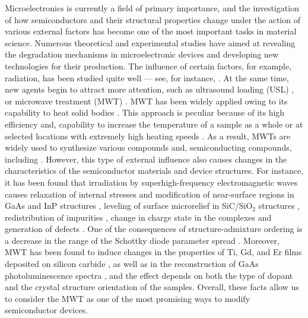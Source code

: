 \documentclass[10pt]{iopart}
\begin{document}
Microelectronics is currently a field of primary importance, and the investigation of how semiconductors and their structural properties change under the action of various external factors has become one of the most important tasks in material science.
Numerous theoretical and experimental studies have aimed at revealing the degradation mechanisms in microelectronic devices and developing new technologies for their production.
The influence of certain factors, for example, radiation, has been studied quite well --- see, for instance, \cite{KozlovsEn,RadiationEffectsBook,DefByIon}.
At the same time, new agents begin to attract more attention, such as ultrasound loading (USL) \cite{Olikh2018JAP,Olikh2006TPL},
or microwave treatment (MWT) \cite{MW:Rev,ZOHM2000,BHUNIA1998,Bacherikov2003En,Pashkov1994En,
BoltovetsEn,Milenin1994En,BelyaevIntac,ASHKINADZE1996,ProcSPIE,Belyaev1998JTFEn,
Bacherikov2008En,Konakova2015En,Konakova2012FTPEn}.
MWT has been widely applied owing to its capability to heat solid bodies \cite{MW:Rev,ZOHM2000}.
This approach is peculiar because of its high efficiency and, capability to increase the temperature
of a sample as a whole or at selected locations with extremely high heating speeds \cite{MW:Rev}.
As a result, MWTs are widely used to synthesize various compounds and, semiconducting compounds, including \cite{MW:Rev,BHUNIA1998}.
However, this type of external influence also causes changes in the  characteristics of the semiconductor materials and device structures.
For instance, it has been found that irradiation by superhigh-frequency electromagnetic waves causes relaxation of internal stresses and modification of near-surface regions
in GaAs and InP structures \cite{BoltovetsEn,Pashkov1994En,Milenin1994En,BelyaevIntac,ProcSPIE,Konakova2015En,Konakova2012FTPEn},
leveling of surface microrelief in SiC/SiO$_2$ structures \cite{Bacherikov2003En},
redistribution of impurities \cite{Bacherikov2003En,Belyaev1998JTFEn,Konakova2015En},
change in charge state in the complexes \cite{Milenin1994En} and generation of defects \cite{Belyaev1998JTFEn}.
One of the consequences of structure-admixture ordering  is a decrease in the range of
the Schottky diode parameter spread \cite{Milenin1994En,Belyaev1998JTFEn}.
Moreover, MWT has been found to induce changes in the properties of Ti, Gd, and Er films deposited on silicon carbide \cite{Bacherikov2008En},
as well as in the reconstruction of GaAs photoluminescence spectra \cite{BelyaevIntac,ProcSPIE,Belyaev1998JTFEn},
and the effect depends on both the type of dopant and the crystal structure orientation of the samples.
Overall, these facts allow us to consider the MWT as one of the most promising ways to modify semiconductor devices.
\end{document}

